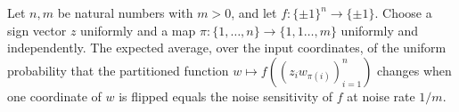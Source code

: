 \begin{theorem}
\label{FABL.expect_partitionFunction_averageInfluence_eq_noiseSensitivity}
\leanok
{}
Let $n,m$ be natural numbers with $m>0$, and let $f\colon\{\pm1\}^n\to\{\pm1\}$. Choose
a sign vector $z$ uniformly and a map $\pi\colon\{1,\ldots,n\}\to\{1,1\ldots,m\}$
uniformly and independently. The expected average, over the input coordinates, of the
uniform probability that the partitioned function $w\mapsto f((z_iw_{\pi(i)})_{i=1}^n)$
changes when one coordinate of $w$ is flipped equals the noise sensitivity of $f$ at
noise rate $1/m$.
\end{theorem}

